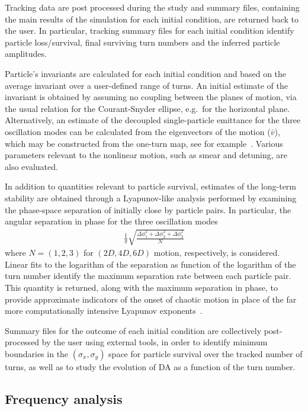 \documentclass[a4paper,
              ]{jacow}
\begin{document}
Tracking data are post processed during the study and summary files, containing the main results of the simulation for each initial condition, are returned back to the user. In particular, tracking summary files for each initial condition identify particle loss/survival, final surviving turn numbers and the inferred particle amplitudes.

Particle's invariants are calculated for each initial condition and based on the average invariant over a user-defined range of turns.
An initial estimate of the invariant is obtained by assuming no coupling between the planes of motion, via the usual relation for the Courant-Snyder ellipse, e.g.\ for the horizontal plane.
Alternatively, an estimate of the decoupled single-particle emittance for the three oscillation modes can be calculated from the eigenvectors of the motion ($\bar{v}$), which may be constructed from the one-turn map, see for example~\cite{maisripken}. Various parameters relevant to the nonlinear motion, such as smear and detuning, are also evaluated.

In addition to quantities relevant to particle survival, estimates of the long-term stability are obtained through a Lyapunov-like analysis performed by examining the phase-space separation of initially close by particle pairs. In particular, the angular separation in phase for the three oscillation modes
\begin{align}
&\frac{1}{\pi}\sqrt{\frac{ \Delta\phi_{1}^2 + \Delta\phi_{2}^2 + \Delta\phi_{3}^2 }{N}}&\nonumber
\end{align}
where $N=(1,2,3)$ for $(2D,4D,6D)$ motion, respectively, is considered. Linear fits to the logarithm of the separation as function of the logarithm of the turn number identify the maximum separation rate between each particle pair. This quantity is returned, along with the maximum separation in phase, to provide approximate indicators of the onset of chaotic motion in place of the far more computationally intensive Lyapunov exponents~\cite{chaosproxy,distanceslope}.

Summary files for the outcome of each initial condition are collectively post-processed by the user using external tools, in order to identify minimum boundaries in the $(\sigma_{x},\sigma_{y})$ space for particle survival over the tracked number of turns, as well as to study the evolution of DA as a function of the turn number.

\subsection{Frequency analysis}
\end{document}
